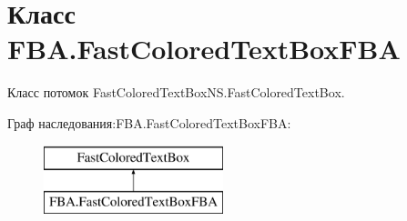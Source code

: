 \hypertarget{class_f_b_a_1_1_fast_colored_text_box_f_b_a}{}\section{Класс F\+B\+A.\+Fast\+Colored\+Text\+Box\+F\+BA}
\label{class_f_b_a_1_1_fast_colored_text_box_f_b_a}


Класс потомок Fast\+Colored\+Text\+Box\+N\+S.\+Fast\+Colored\+Text\+Box.  


Граф наследования\+:F\+B\+A.\+Fast\+Colored\+Text\+Box\+F\+BA\+:\begin{figure}[H]
\begin{center}
\leavevmode
\includegraphics[height=2.000000cm]{class_f_b_a_1_1_fast_colored_text_box_f_b_a}
\end{center}
\end{figure}
